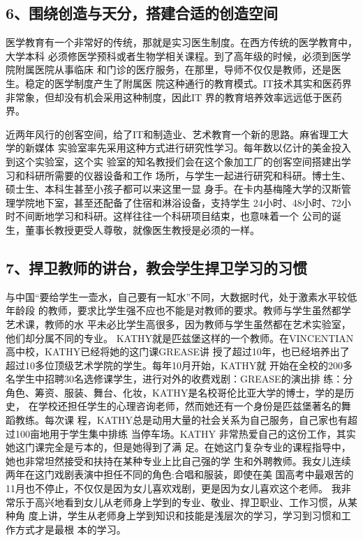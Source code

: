 \documentclass[11pt]{ctexart}
\begin{document}
{{{{\subsection{6、围绕创造与天分，搭建合适的创造空间}
\label{sec:org1b9d9a0}

医学教育有一个非常好的传统，那就是实习医生制度。在西方传统的医学教育中，大学本科
必须修医学预科或者生物学相关课程。到了高年级的时候，必须到医学院附属医院从事临床
和门诊的医疗服务，在那里，导师不仅仅是教师，还是医生。稳定的医学制度产生了附属医
院这种通行的教育模式。IT技术其实和医药界非常象，但却没有机会采用这种制度，因此IT
界的教育培养效率远远低于医药界。

近两年风行的创客空间，给了IT和制造业、艺术教育一个新的思路。麻省理工大学的新媒体
实验室率先采用这种方式进行研究性学习。每年数以亿计的美金投入到这个实验室，这个实
验室的知名教授们会在这个象加工厂的创客空间搭建出学习和科研所需要的仪器设备和工作
场所，与学生一起进行研究和科研。博士生、硕士生、本科生甚至小孩子都可以来这里一显
身手。在卡内基梅隆大学的汉斯管理学院地下室，甚至还配备了住宿和淋浴设备，支持学生
24小时、48小时、72小时不间断地学习和科研。这样往往一个科研项目结束，也意味着一个
公司的诞生，董事长教授更受人尊敬，就像医生教授是必须的一样。

\subsection{7、捍卫教师的讲台，教会学生捍卫学习的习惯}
\label{sec:org77d79a0}

与中国“要给学生一壶水，自己要有一缸水”不同，大数据时代，处于激素水平较低年龄段
的教师，要求比学生强不应也不能是对教师的要求。教师与学生虽然都学艺术课，教师的水
平未必比学生高很多，因为教师与学生虽然都在艺术实验室，他们却分属不同的专业。
KATHY就是匹兹堡这样的一个教师。在VINCENTIAN高中校，KATHY已经将她的这门课GREASE讲
授了超过10年，也已经培养出了超过10多位顶级艺术学院的学生。每年10月开始，KATHY就
开始在全校的200多名学生中招聘30名选修课学生，进行对外的收费戏剧：GREASE的演出排
练：分角色、筹资、服装、舞台、化妆，KATHY是名校哥伦比亚大学的博士，学的是历史，
在学校还担任学生的心理咨询老师，然而她还有一个身份是匹兹堡著名的舞蹈教练。每次课
程，KATHY总是动用大量的社会关系为自己服务，自己家也有超过100亩地用于学生集中排练
当停车场。KATHY 非常热爱自己的这份工作，其实她这门课完全是亏本的，但是她得到了满
足。在她这门复杂专业的课程指导中，她也非常坦然接受和扶持在某种专业上比自己强的学
生和外聘教师。我女儿连续两年在这门戏剧表演中担任不同的角色:合唱和服装，即使在美
国高考中最艰苦的11月也不停止，不仅仅是因为女儿喜欢戏剧，更是因为女儿喜欢这个老师。
我非常乐于高兴地看到女儿从老师身上学到的专业、敬业、捍卫职业、工作习惯，从某种角
度上讲，学生从老师身上学到知识和技能是浅层次的学习，学习到习惯和工作方式才是最根
本的学习。

}}}}
\end{document}
